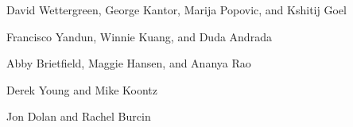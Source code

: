 
\setlength{\parskip}{1em}
\setlength{\parindent}{0em}

\noindent
David Wettergreen, George Kantor, Marija Popovic, and Kshitij Goel

Francisco Yandun, Winnie Kuang, and Duda Andrada

Abby Brietfield, Maggie Hansen, and Ananya Rao

Derek Young and Mike Koontz

Jon Dolan and Rachel Burcin
